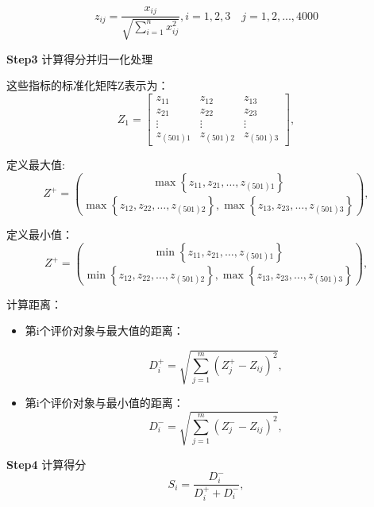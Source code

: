 \documentclass[withoutpreface,bwprint]{cumcmthesis}
\begin{document}
\begin{equation}
\label{eq:公式1}
z_{ij}=\frac{x_{ij}}{\sqrt{\sum_{i=1}^nx_{ij}^2}},i=1,2,3\quad j=1,2,...,4000
\end{equation}

\textbf{Step3} 计算得分并归一化处理
\par
这些指标的标准化矩阵Z表示为：
\begin{equation}
\label{eq:公式1}
Z_1=
\begin{bmatrix}
z_{11} & z_{12} & z_{13} \\
z_{21} & z_{22} & z_{23} \\
\vdots & \vdots & \vdots \\
z_{(501)1} & z_{(501)2} & z_{(501)3}
\end{bmatrix},
\end{equation}
\par
定义最大值:
\begin{equation}
\label{eq:公式1}
Z^{+}=\binom{\max \left\{z_{11}, z_{21}, \ldots, z_{(501) 1}\right\}}{\max \left\{z_{12}, z_{22}, \ldots, z_{(501) 2}\right\}, \max \left\{z_{13}, z_{23}, \ldots, z_{(501)3}\right\}},
\end{equation}

\par
定义最小值：
\begin{equation}
\label{eq:公式1}
Z^{+}=\binom{\min \left\{z_{11}, z_{21}, \ldots, z_{(501) 1}\right\}}{\min \left\{z_{12}, z_{22}, \ldots, z_{(501) 2}\right\}, \max \left\{z_{13}, z_{23}, \ldots, z_{(501)3}\right\}},
\end{equation}

\par
计算距离：
\begin{itemize}
\item 	第i个评价对象与最大值的距离：
\par
\begin{equation}
\label{eq:公式1}
D_{i}^{+}=\sqrt{\sum_{j=1}^{m}\left(Z_{j}^{+}-Z_{i j}\right)^{2}},
\end{equation}

\item 	第i个评价对象与最小值的距离：
\begin{equation}
\label{eq:公式1}
D_{i}^{-}=\sqrt{\sum_{j=1}^{m}\left(Z_{j}^{-}-Z_{i j}\right)^{2}},
\end{equation}
\end{itemize}

\textbf{Step4} 计算得分
\begin{equation}
\label{eq:公式1}
S_i=\frac{D_i^-}{D_i^++D_i^-},
\end{equation}
\end{document}
